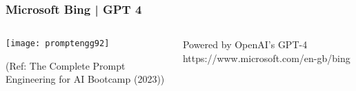 \begin{frame}[fragile]\frametitle{Microsoft Bing | GPT 4}


\begin{columns}
    \begin{column}[T]{0.6\linewidth}
		\begin{center}
		\texttt{[image: promptengg92]}

		{\tiny (Ref: The Complete Prompt Engineering for AI Bootcamp (2023))}
		\end{center}	
    \end{column}
    \begin{column}[T]{0.4\linewidth}
		Powered by OpenAI’s GPT-4
		https://www.microsoft.com/en-gb/bing
    \end{column}
  \end{columns}
\end{frame}














